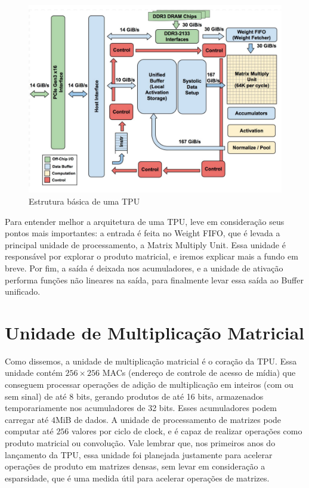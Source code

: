 \documentclass{report}
\begin{document}
\begin{figure}[h]
	\includegraphics[scale=0.7]{tpu-block-diagram}
	\centering
	\caption{Estrutura básica de uma TPU}
\end{figure}

Para entender melhor a arquitetura de uma TPU, leve em consideração seus pontos mais importantes: a entrada é feita no Weight FIFO, que é levada a principal unidade de processamento, a Matrix Multiply Unit. Essa unidade é responsável por explorar o produto matricial, e iremos explicar mais a fundo em breve. Por fim, a saída é deixada nos acumuladores, e a unidade de ativação performa funções não lineares na saída, para finalmente levar essa saída ao Buffer unificado.

\section{Unidade de Multiplicação Matricial}

Como dissemos, a unidade de multiplicação matricial é o coração da TPU. Essa unidade contém $256 \times 256$ MACs (endereço de controle de acesso de mídia) que conseguem processar operações de adição de multiplicação em inteiros (com ou sem sinal) de até 8 bits, gerando produtos de até 16 bits, armazenados temporariamente nos acumuladores de 32 bits. Esses acumuladores podem carregar até $4$MiB de dados. A unidade de processamento de matrizes pode computar até $256$ valores por ciclo de clock, e é capaz de realizar operações como produto matricial ou convolução. Vale lembrar que, nos primeiros anos do lançamento da TPU, essa unidade foi planejada justamente para acelerar operações de produto em matrizes densas, sem levar em consideração a esparsidade, que é uma medida útil para acelerar operações de matrizes.
\end{document}
